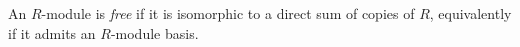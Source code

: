 
An $R$-module is \emph{free} if it is isomorphic to a direct sum of copies of $R$, equivalently if it admits an $R$-module basis.
